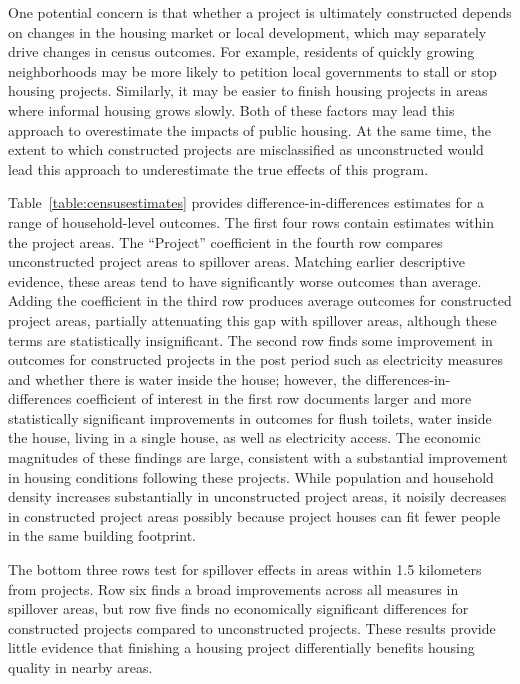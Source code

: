 \documentclass[12pt]{article}
\begin{document}
One potential concern is that whether a project is ultimately constructed depends on changes in the housing market or local development, which may separately drive changes in census outcomes.  For example, residents of quickly growing neighborhoods may be more likely to petition local governments to stall or stop housing projects.  Similarly, it may be easier to finish housing projects in areas where informal housing grows slowly.  Both of these factors may lead this approach to overestimate the impacts of public housing.  At the same time, the extent to which constructed projects are misclassified as unconstructed would lead this approach to underestimate the true effects of this program.

Table~\ref{table:censusestimates} provides difference-in-differences estimates for a range of household-level outcomes.  The first four rows contain estimates within the project areas.  The ``Project'' coefficient in the fourth row compares unconstructed project areas to spillover areas.  Matching earlier descriptive evidence, these areas tend to have significantly worse outcomes than average.  Adding the coefficient in the third row produces average outcomes for constructed project areas, partially attenuating this gap with spillover areas, although these terms are statistically insignificant.  The second row finds some improvement in outcomes for constructed projects in the post period such as electricity measures and whether there is water inside the house; however, the differences-in-differences coefficient of interest in the first row documents larger and more statistically significant improvements in outcomes for flush toilets, water inside the house, living in a single house, as well as electricity access.  The economic magnitudes of these findings are large, consistent with a substantial improvement in housing conditions following these projects.  While population and household density increases substantially in unconstructed project areas, it noisily decreases in constructed project areas possibly because project houses can fit fewer people in the same building footprint.

The bottom three rows test for spillover effects in areas within 1.5 kilometers from projects.  Row six finds a broad improvements across all measures in spillover areas, but row five finds no economically significant differences for constructed projects compared to unconstructed projects.  These results provide little evidence that finishing a housing project differentially benefits housing quality in nearby areas.
\end{document}
